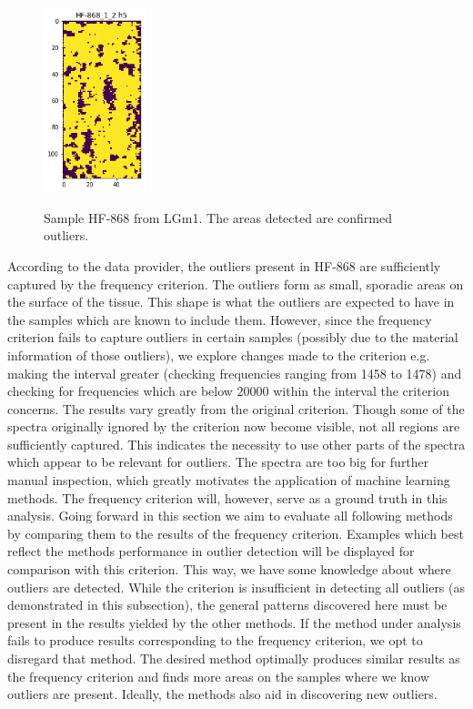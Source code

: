 \begin{figure}[H]

    \centering
{\includegraphics[width=3cm]{images/AdriansCriterion/LGm-1/HF-868_1_2.h5_0.png} }
\caption{Sample HF-868 from LGm1. The areas detected are confirmed outliers.\label{fig:ADHF868}}%

\end{figure}

According to the data provider, the outliers present in HF-868 are sufficiently captured by the frequency criterion. The outliers form as small, sporadic areas on the surface of the tissue. This shape is what the outliers are expected to have in the samples which are known to include them. However, since the frequency criterion fails to capture outliers in certain samples (possibly due to the material information of those outliers), we explore changes made to the criterion e.g. making the interval greater (checking frequencies ranging from 1458 to 1478) and checking for frequencies which are below $20000$ within the interval the criterion concerns. The results vary greatly from the original criterion. Though some of the spectra originally ignored by the criterion now become visible, not all regions are sufficiently captured. This indicates the necessity to use other parts of the spectra which appear to be relevant for outliers. The spectra are too big for further manual inspection, which greatly motivates the application of machine learning methods. The frequency criterion will, however, serve as a ground truth in this analysis. Going forward in this section we aim to evaluate all following methods by comparing them to the results of the frequency criterion. Examples which best reflect the methods performance in outlier detection will be displayed for comparison with this criterion. This way, we have some knowledge about where outliers are detected. While the criterion is insufficient in detecting all  outliers (as demonstrated in this subsection), the general patterns discovered here must be present in the results yielded by the other methods. If the method under analysis fails to produce results corresponding to the frequency criterion, we opt to disregard that method. The desired method optimally produces similar results as the frequency criterion and finds more areas on the samples where we know outliers are present. Ideally, the methods also aid in discovering new outliers.

